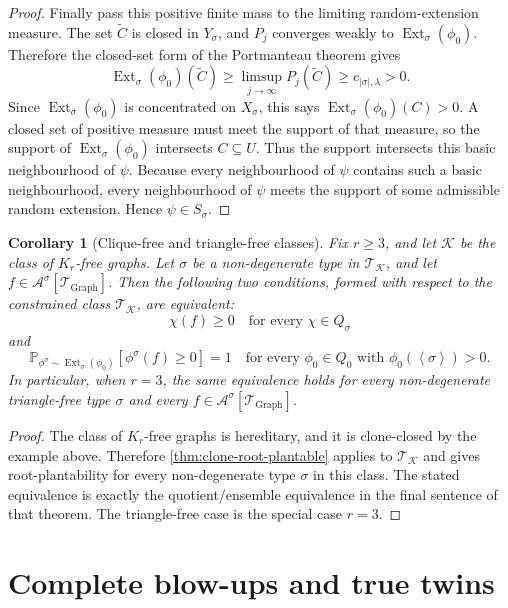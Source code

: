 \documentclass[11pt]{article}
\newtheorem{corollary}[corollary]{Corollary}
\theoremstyle{definition}
\newcommand{\Prob}{\mathbb{P}}
\newcommand{\A}{\mathcal{A}}
\newcommand{\K}{\mathcal{K}}
\newcommand{\T}{\mathcal{T}}
\newcommand{\Ext}{\operatorname{Ext}}
\newcommand{\brak}[1]{\left\langle #1\right\rangle}
\begin{document}
\begin{proof}
Finally pass this positive finite mass to the limiting random-extension measure.
The set $\widetilde C$ is closed in $Y_\sigma$, and $P_j$ converges weakly to
$\Ext_\sigma(\phi_0)$.  Therefore the closed-set form of the Portmanteau theorem
gives
\[
  \Ext_\sigma(\phi_0)(\widetilde C)
  \ge
  \limsup_{j\to\infty} P_j(\widetilde C)
  \ge c_{|\sigma|,\lambda}>0.
\]
Since $\Ext_\sigma(\phi_0)$ is concentrated on $X_\sigma$, this says
$\Ext_\sigma(\phi_0)(C)>0$.  A closed set of positive measure must meet the
support of that measure, so the support of $\Ext_\sigma(\phi_0)$ intersects
$C\subseteq U$.  Thus the support intersects this basic neighbourhood of $\psi$.
Because every neighbourhood of $\psi$ contains such a basic neighbourhood, every
neighbourhood of $\psi$ meets the support of some admissible random extension.
Hence $\psi\in S_\sigma$.
\end{proof}

\begin{corollary}[Clique-free and triangle-free classes]\label{cor:clique-free}
Fix $r\ge3$, and let $\K$ be the class of $K_r$-free graphs.  Let $\sigma$ be a
non-degenerate type in $\T_\K$, and let $f\in\A^\sigma[\T_{\mathrm{Graph}}]$.
Then the following two conditions, formed with respect to the constrained class
$\T_\K$, are equivalent:
\[
  \chi(f)\ge0\quad\text{for every }\chi\in Q_\sigma
\]
and
\[
  \Prob_{\phi^\sigma\sim\Ext_\sigma(\phi_0)}
  [\phi^\sigma(f)\ge0]=1
  \quad\text{for every }\phi_0\in Q_0
  \text{ with }\phi_0(\brak\sigma)>0.
\]
In particular, when $r=3$, the same equivalence holds for every non-degenerate
triangle-free type $\sigma$ and every $f\in\A^\sigma[\T_{\mathrm{Graph}}]$.
\end{corollary}

\begin{proof}
The class of $K_r$-free graphs is hereditary, and it is clone-closed by the
example above.  Therefore \cref{thm:clone-root-plantable} applies to $\T_\K$ and
gives root-plantability for every non-degenerate type $\sigma$ in this class.
The stated equivalence is exactly the quotient/ensemble equivalence in the final
sentence of that theorem.  The triangle-free case is the special case $r=3$.
\end{proof}

\section{Complete blow-ups and true twins}
\end{document}
